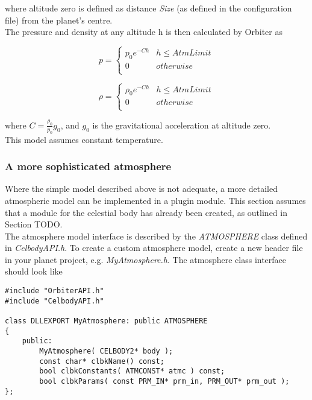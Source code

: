 \documentclass[Orbiter Developer Manual.tex]{subfiles}
\begin{document}
\noindent
where altitude zero is defined as distance \textit{Size} (as defined in the configuration file) from the planet's centre.\\
The pressure and density at any altitude h is then calculated by Orbiter as

\[ p =
\left\{
\begin{array}{ll}
	p_{0}e^{-Ch} & h \leq AtmLimit \\
	0 & otherwise \\
\end{array} 
\right. \]

\[ \rho =
\left\{
\begin{array}{ll}
	\rho_{0}e^{-Ch} & h \leq AtmLimit \\
	0 & otherwise \\
\end{array} 
\right. \]

\noindent
where $C = \frac{\rho_{0}}{p_{0}}g_{0}$, and $g_{0}$ is the gravitational acceleration at altitude zero.\\
This model assumes constant temperature.


\subsubsection{A more sophisticated atmosphere}
Where the simple model described above is not adequate, a more detailed atmospheric model can be implemented in a plugin module. This section assumes that a module for the celestial body has already been created, as outlined in Section TODO.\\
The atmosphere model interface is described by the \textit{ATMOSPHERE} class defined in \textit{CelbodyAPI.h}. To create a custom atmosphere model, create a new header file in your planet project, e.g. \textit{MyAtmosphere.h}. The atmosphere class interface should look like

\begin{lstlisting}
#include "OrbiterAPI.h"
#include "CelbodyAPI.h"

class DLLEXPORT MyAtmosphere: public ATMOSPHERE
{
	public:
		MyAtmosphere( CELBODY2* body );
		const char* clbkName() const;
		bool clbkConstants( ATMCONST* atmc ) const;
		bool clbkParams( const PRM_IN* prm_in, PRM_OUT* prm_out );
};
\end{lstlisting}
\end{document}
